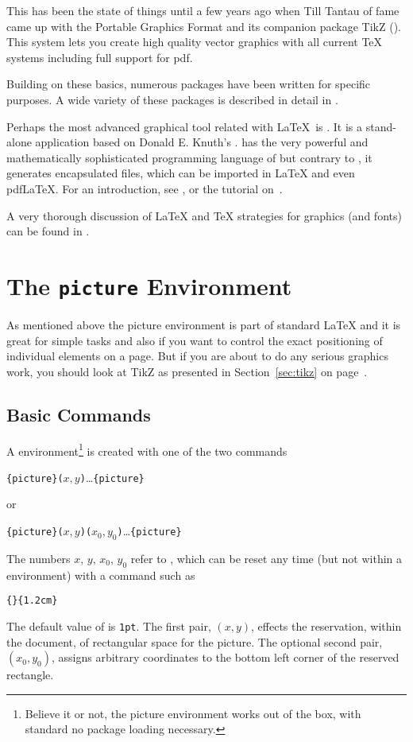 This has been the state of things until a few years ago when Till Tantau of
 fame came up with the Portable Graphics Format  and its
companion package TikZ (). This system lets you create high
quality vector graphics with all current \TeX{} systems including full
support for pdf.

Building on these basics, numerous packages have been written for specific
purposes. A wide variety of these packages is described in detail in
\graphicscompanion{}.

Perhaps the most advanced graphical tool related with \LaTeX\ is \MP{}. It is a stand-alone application
based on Donald E. Knuth's \MF{}. \MP{} has the very powerful and
mathematically sophisticated programming language of \MF{} but contrary to \MF,
it generates encapsulated \PSi{} files,
which can be imported in \LaTeX{} and even pdf\LaTeX{}. For an introduction, see \hobby, or the tutorial on~\cite{ursoswald}.

A very thorough discussion of \LaTeX{} and \TeX{} strategies for graphics (and fonts) can
be found in \hoenig.

\section{The \texttt{picture} Environment}

As mentioned above the picture environment is part of standard \LaTeX{} and it is great for simple tasks and also if you want
to control the exact positioning of individual elements on a page. But if you are about to do any serious graphics work, you should
look at TikZ as presented in Section~\ref{sec:tikz} on page~\pageref{sec:tikz}.

\subsection{Basic Commands}

A  environment\footnote{Believe it or not, the picture environment works out of the
  box, with standard \LaTeXe{} no package loading necessary.} is created with one of the two commands
\begin{lscommand}
  \verb|{picture}(|$x,y$\verb|)|\ldots{}\verb|{picture}|
\end{lscommand}
\noindent or
\begin{lscommand}
  \verb|{picture}(|$x,y$\verb|)(|$x_0,y_0$\verb|)|\ldots{}\verb|{picture}|
\end{lscommand}
The numbers $x,\,y,\,x_0,\,y_0$ refer to , which can be reset any time
(but not within a  environment) with a command such as
\begin{lscommand}
  \verb|{|\verb|}{1.2cm}|
\end{lscommand}
The default value of  is \texttt{1pt}. The first pair, $(x,y)$, effects
the reservation, within the document, of rectangular space for the picture. The optional
second pair, $(x_0,y_0)$, assigns arbitrary coordinates to the bottom left corner of the
reserved rectangle.

